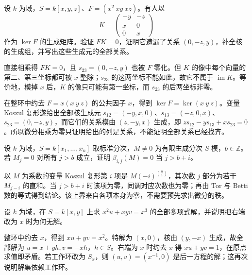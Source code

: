 \begin{exercise}\label{b3:ex:21-kernel-certificate}
	设 \(k\) 为域，\(S=k[x,y,z]\)、\(F=(x^2\ xy\ xz)\)。有人以
	\[
		K=\begin{pmatrix}-y&-z\\x&0\\0&x\end{pmatrix}
	\]
	作为 \(\ker F\) 的生成矩阵。验证 \(FK=0\)，证明它遗漏了关系 \((0,-z,y)\)，补全核的生成组，并写出这些生成元的全部关系。
\end{exercise}
\begin{solution}
	直接相乘得 \(FK=0\)，且 \(s_{23}=(0,-z,y)\) 也被 \(F\) 零化。但 \(K\) 的像中每个向量的第二、第三坐标都可被 \(x\) 整除；\(s_{23}\) 的这两坐标不能如此，故它不属于 \(\operatorname{im}K\)。等价地，模掉 \(x\) 后，\(K\) 的像只可能有第一坐标，而 \(s_{23}\) 的后两坐标非零。

	在整环中约去 \(F=x(x\ y\ z)\) 的公共因子 \(x\)，得到 \(\ker F=\ker(x\ y\ z)\)。变量 Koszul 复形遂给出全部核生成元 \(s_{12}=(-y,x,0)\)、\(s_{13}=(-z,0,x)\)、\(s_{23}=(0,-z,y)\)，而它们的关系模由 \((z,-y,x)\) 生成，即 \(z s_{12}-y s_{13}+x s_{23}=0\)。所以微分相乘为零只证明给出的列是关系，不能证明全部关系已经找齐。
\end{solution}

\begin{exercise}\label{b3:ex:21-top-degree-bound}
	设 \(k\) 为域，\(S=k[x_1,\ldots,x_n]\) 取标准分次，\(M\ne0\) 为有限生成分次 \(S\) 模，\(b\in\mathbb Z\)。若 \(M_j=0\) 对所有 \(j>b\) 成立，证明 \(\beta_{i,j}(M)=0\) 当 \(j>b+i\)。
\end{exercise}
\begin{solution}
	以 \(M\) 为系数的变量 Koszul 复形第 \(i\) 项是 \(M(-i)^{\binom ni}\)，其次数 \(j\) 部分为若干 \(M_{j-i}\) 的直和。当 \(j>b+i\) 时该项为零，同调对应次数也为零；再由 Tor 与 Betti 数的等式得到结论。该上界来自各项本身为零，不需要预先求出微分的秩。
\end{solution}


\begin{exercise}\label{b3:ex:21-polynomial-inhomogeneous}
	设 \(k\) 为域，在 \(S=k[x,y]\) 上求 \(x^2u+xyv=x^3\) 的全部多项式解，并说明把右端改为 \(x\) 时为何无解。
\end{exercise}
\begin{solution}
	整环中约去 \(x\)，得到 \(xu+yv=x^2\)。特解为 \((x,0)\)，核由 \((y,-x)\) 生成，故全部解为 \(u=x+yh,v=-xh\)，\(h\in S\)。右端为 \(x\) 时约去 \(x\) 得 \(xu+yv=1\)，在原点求值即矛盾。若工作环改为 \(S_x\)，则 \((u,v)=(x^{-1},0)\) 是后一方程的解；这再次说明解集依赖工作环。
\end{solution}

